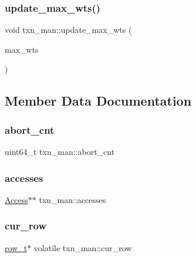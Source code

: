 \subsubsection{\texorpdfstring{update\+\_\+max\+\_\+wts()}{update\_max\_wts()}}
{\footnotesize\ttfamily void txn\+\_\+man\+::update\+\_\+max\+\_\+wts (\begin{DoxyParamCaption}\item[{\hyperlink{global_8h_aaf095dfc9b10f757c968fe146ad7e724}{ts\+\_\+t}}]{max\+\_\+wts }\end{DoxyParamCaption})}



\subsection{Member Data Documentation}
\mbox{\label{classtxn__man_a817eda721f4a25d114c9f44b6f19963c}} 
\subsubsection{\texorpdfstring{abort\+\_\+cnt}{abort\_cnt}}
{\footnotesize\ttfamily uint64\+\_\+t txn\+\_\+man\+::abort\+\_\+cnt}

\mbox{\label{classtxn__man_af5f2cec4241127bbaa1047a52b18aa02}} 
\subsubsection{\texorpdfstring{accesses}{accesses}}
{\footnotesize\ttfamily \hyperlink{classAccess}{Access}$\ast$$\ast$ txn\+\_\+man\+::accesses}

\mbox{\label{classtxn__man_a5ed85ee9e6374ffe85966747e354c222}} 
\subsubsection{\texorpdfstring{cur\+\_\+row}{cur\_row}}
{\footnotesize\ttfamily \hyperlink{classrow__t}{row\+\_\+t}$\ast$ volatile txn\+\_\+man\+::cur\+\_\+row}

